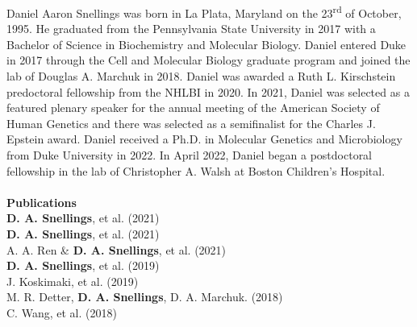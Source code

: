 \biography

Daniel Aaron Snellings was born in La Plata, Maryland on the 23\textsuperscript{rd} of October, 1995. He graduated from the Pennsylvania State University in 2017 with a Bachelor of Science in Biochemistry and Molecular Biology. Daniel entered Duke in 2017 through the Cell and Molecular Biology graduate program and joined the lab of Douglas A. Marchuk in 2018. Daniel was awarded a Ruth L. Kirschstein predoctoral fellowship from the NHLBI in 2020. In 2021, Daniel was selected as a featured plenary speaker for the annual meeting of the American Society of Human Genetics and there was selected as a semifinalist for the Charles J. Epstein award. Daniel received a Ph.D. in Molecular Genetics and Microbiology from Duke University in 2022. In April 2022, Daniel began a postdoctoral fellowship in the lab of Christopher A. Walsh at Boston Children's Hospital.
\\\\
{\Large \textbf{Publications}} \\
\textbf{D. A. Snellings}, et al. (2021) \\ %
\textbf{D. A. Snellings}, et al. (2021) \\ \nocite{snellings2021}
A. A. Ren \& \textbf{D. A. Snellings}, et al. (2021) \\ \nocite{ren2021}
\textbf{D. A. Snellings}, et al. (2019) \\ \nocite{snellings2019}
J. Koskimaki, et al. (2019) \\ \nocite{koskimaki2019}
M. R. Detter, \textbf{D. A. Snellings}, D. A. Marchuk. (2018) \\ \nocite{detter2018}
C. Wang, et al. (2018)  \nocite{wang2018}